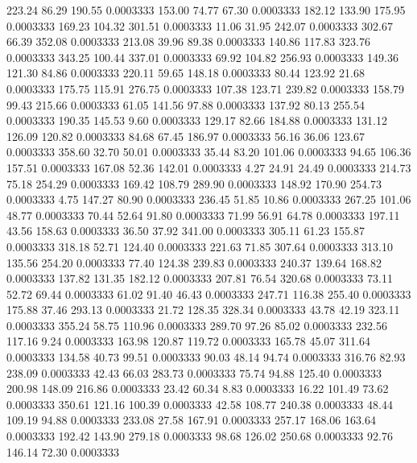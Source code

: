  223.24   86.29  190.55   0.0003333
 153.00   74.77   67.30   0.0003333
 182.12  133.90  175.95   0.0003333
 169.23  104.32  301.51   0.0003333
  11.06   31.95  242.07   0.0003333
 302.67   66.39  352.08   0.0003333
 213.08   39.96   89.38   0.0003333
 140.86  117.83  323.76   0.0003333
 343.25  100.44  337.01   0.0003333
  69.92  104.82  256.93   0.0003333
 149.36  121.30   84.86   0.0003333
 220.11   59.65  148.18   0.0003333
  80.44  123.92   21.68   0.0003333
 175.75  115.91  276.75   0.0003333
 107.38  123.71  239.82   0.0003333
 158.79   99.43  215.66   0.0003333
  61.05  141.56   97.88   0.0003333
 137.92   80.13  255.54   0.0003333
 190.35  145.53    9.60   0.0003333
 129.17   82.66  184.88   0.0003333
 131.12  126.09  120.82   0.0003333
  84.68   67.45  186.97   0.0003333
  56.16   36.06  123.67   0.0003333
 358.60   32.70   50.01   0.0003333
  35.44   83.20  101.06   0.0003333
  94.65  106.36  157.51   0.0003333
 167.08   52.36  142.01   0.0003333
   4.27   24.91   24.49   0.0003333
 214.73   75.18  254.29   0.0003333
 169.42  108.79  289.90   0.0003333
 148.92  170.90  254.73   0.0003333
   4.75  147.27   80.90   0.0003333
 236.45   51.85   10.86   0.0003333
 267.25  101.06   48.77   0.0003333
  70.44   52.64   91.80   0.0003333
  71.99   56.91   64.78   0.0003333
 197.11   43.56  158.63   0.0003333
  36.50   37.92  341.00   0.0003333
 305.11   61.23  155.87   0.0003333
 318.18   52.71  124.40   0.0003333
 221.63   71.85  307.64   0.0003333
 313.10  135.56  254.20   0.0003333
  77.40  124.38  239.83   0.0003333
 240.37  139.64  168.82   0.0003333
 137.82  131.35  182.12   0.0003333
 207.81   76.54  320.68   0.0003333
  73.11   52.72   69.44   0.0003333
  61.02   91.40   46.43   0.0003333
 247.71  116.38  255.40   0.0003333
 175.88   37.46  293.13   0.0003333
  21.72  128.35  328.34   0.0003333
  43.78   42.19  323.11   0.0003333
 355.24   58.75  110.96   0.0003333
 289.70   97.26   85.02   0.0003333
 232.56  117.16    9.24   0.0003333
 163.98  120.87  119.72   0.0003333
 165.78   45.07  311.64   0.0003333
 134.58   40.73   99.51   0.0003333
  90.03   48.14   94.74   0.0003333
 316.76   82.93  238.09   0.0003333
  42.43   66.03  283.73   0.0003333
  75.74   94.88  125.40   0.0003333
 200.98  148.09  216.86   0.0003333
  23.42   60.34    8.83   0.0003333
  16.22  101.49   73.62   0.0003333
 350.61  121.16  100.39   0.0003333
  42.58  108.77  240.38   0.0003333
  48.44  109.19   94.88   0.0003333
 233.08   27.58  167.91   0.0003333
 257.17  168.06  163.64   0.0003333
 192.42  143.90  279.18   0.0003333
  98.68  126.02  250.68   0.0003333
  92.76  146.14   72.30   0.0003333
